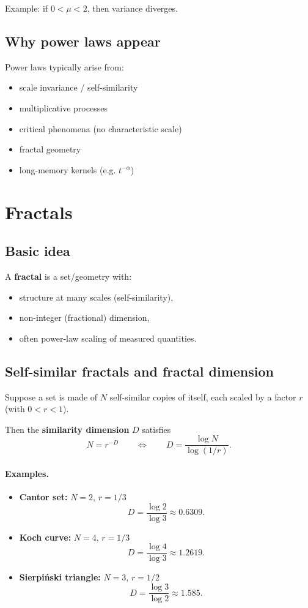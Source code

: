 Example: if $0<\mu<2$, then variance diverges.

\subsection{Why power laws appear}
Power laws typically arise from:
\begin{itemize}
\item scale invariance / self-similarity
\item multiplicative processes
\item critical phenomena (no characteristic scale)
\item fractal geometry
\item long-memory kernels (e.g. $t^{-\alpha}$)
\end{itemize}


\section{Fractals}

\subsection{Basic idea}
A \textbf{fractal} is a set/geometry with:
\begin{itemize}
\item structure at many scales (self-similarity),
\item non-integer (fractional) dimension,
\item often power-law scaling of measured quantities.
\end{itemize}

\subsection{Self-similar fractals and fractal dimension}
Suppose a set is made of $N$ self-similar copies of itself,
each scaled by a factor $r$ (with $0<r<1$).

Then the \textbf{similarity dimension} $D$ satisfies
\begin{equation}
N = r^{-D}
\qquad\Longleftrightarrow\qquad
D=\frac{\log N}{\log(1/r)}.
\end{equation}

\paragraph{Examples.}
\begin{itemize}
\item \textbf{Cantor set:} $N=2$, $r=1/3$
\[
D=\frac{\log 2}{\log 3}\approx 0.6309.
\]
\item \textbf{Koch curve:} $N=4$, $r=1/3$
\[
D=\frac{\log 4}{\log 3}\approx 1.2619.
\]
\item \textbf{Sierpiński triangle:} $N=3$, $r=1/2$
\[
D=\frac{\log 3}{\log 2}\approx 1.585.
\]
\end{itemize}

